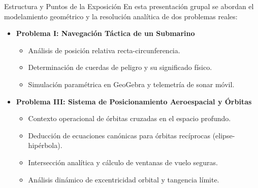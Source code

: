 \documentclass[aspectratio=169]{beamer}
\begin{document}
\begin{frame}{Estructura y Puntos de la Exposición}
  En esta presentación grupal se abordan el modelamiento geométrico y la resolución analítica de dos problemas reales:
  \vspace{0.4cm}
  \begin{itemize}
    \item \textbf{Problema I: Navegación Táctica de un Submarino}
      \begin{itemize}
        \item Análisis de posición relativa recta-circunferencia.
        \item Determinación de cuerdas de peligro y su significado físico.
        \item Simulación paramétrica en GeoGebra y telemetría de sonar móvil.
      \end{itemize}
    \vspace{0.3cm}
    \item \textbf{Problema III: Sistema de Posicionamiento Aeroespacial y Órbitas}
      \begin{itemize}
        \item Contexto operacional de órbitas cruzadas en el espacio profundo.
        \item Deducción de ecuaciones canónicas para órbitas recíprocas (elipse-hipérbola).
        \item Intersección analítica y cálculo de ventanas de vuelo seguras.
        \item Análisis dinámico de excentricidad orbital y tangencia límite.
      \end{itemize}
  \end{itemize}
\end{frame}
\end{document}
